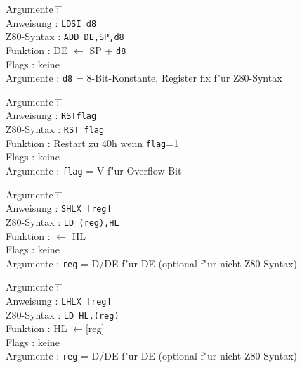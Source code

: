 \documentclass[12pt,a4paper,twoside]{report}
\newcommand{\tty}[1]{{\tt #1}}
\begin{document}
\begin{tabbing}
Argumente         \= : \= \kill \\
Anweisung         \> : \> \tty{LDSI d8} \\
Z80-Syntax        \> : \> \tty{ADD DE,SP,d8} \\
Funktion          \> : \> DE $\leftarrow$ SP + {\tt d8} \\
Flags             \> : \> keine \\
Argumente         \> : \> {\tt d8} = 8-Bit-Konstante, Register fix f"ur Z80-Syntax \\
\end{tabbing}

\begin{tabbing}
Argumente         \= : \= \kill \\
Anweisung         \> : \> \tty{RSTflag} \\
Z80-Syntax        \> : \> \tty{RST flag} \\
Funktion          \> : \> Restart zu 40h wenn {\tt flag}=1 \\
Flags             \> : \> keine \\
Argumente         \> : \> {\tt flag} = V f"ur Overflow-Bit \\
\end{tabbing}

\begin{tabbing}
Argumente         \= : \= \kill \\
Anweisung         \> : \> \tty{SHLX [reg]} \\
Z80-Syntax        \> : \> \tty{LD (reg),HL} \\
Funktion          \> : \> [reg] $\leftarrow$ HL \\
Flags             \> : \> keine \\
Argumente         \> : \> \tty{reg} = D/DE f"ur DE (optional f"ur nicht-Z80-Syntax) \\
\end{tabbing}

\begin{tabbing}
Argumente         \= : \= \kill \\
Anweisung         \> : \> \tty{LHLX [reg]} \\
Z80-Syntax        \> : \> \tty{LD HL,(reg)} \\
Funktion          \> : \> HL $\leftarrow$[reg] \\
Flags             \> : \> keine \\
Argumente         \> : \> \tty{reg} = D/DE f"ur DE (optional f"ur nicht-Z80-Syntax) \\
\end{tabbing}
\end{document}
